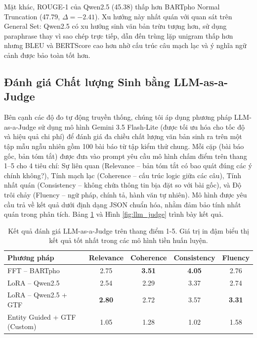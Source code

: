 \documentclass{article}
\begin{document}
Mặt khác, ROUGE-1 của Qwen2.5 (45.38) thấp hơn BARTpho Normal Truncation (47.79, $\Delta = -2.41$). Xu hướng này nhất quán với quan sát trên General Set: Qwen2.5 có xu hướng sinh văn bản trừu tượng hơn, sử dụng paraphrase thay vì sao chép trực tiếp, dẫn đến trùng lặp unigram thấp hơn nhưng BLEU và BERTScore cao hơn nhờ cấu trúc câu mạch lạc và ý nghĩa ngữ cảnh được bảo toàn tốt hơn.

\subsection{Đánh giá Chất lượng Sinh bằng LLM-as-a-Judge}\label{sec:llm_judge}

Bên cạnh các độ đo tự động truyền thống, chúng tôi áp dụng phương pháp LLM-as-a-Judge sử dụng mô hình Gemini 3.5 Flash-Lite (được tối ưu hóa cho tốc độ và hiệu quả chi phí) để đánh giá đa chiều chất lượng văn bản sinh ra trên một tập mẫu ngẫu nhiên gồm 100 bài báo từ tập kiểm thử chung. Mỗi cặp (bài báo gốc, bản tóm tắt) được đưa vào prompt yêu cầu mô hình chấm điểm trên thang 1--5 cho 4 tiêu chí: Sự liên quan (Relevance -- bản tóm tắt có bao quát đúng các ý chính không?), Tính mạch lạc (Coherence -- cấu trúc logic giữa các câu), Tính nhất quán (Consistency -- không chứa thông tin bịa đặt so với bài gốc), và Độ trôi chảy (Fluency -- ngữ pháp, chính tả, hành văn tự nhiên). Mô hình được yêu cầu trả về kết quả dưới định dạng JSON chuẩn hóa, nhằm đảm bảo tính nhất quán trong phân tích. Bảng \ref{tab:llm_judge} và Hình \ref{fig:llm_judge} trình bày kết quả.

\begin{table}[H]
\centering
\caption{Kết quả đánh giá LLM-as-a-Judge trên thang điểm 1-5. Giá trị in đậm biểu thị kết quả tốt nhất trong các mô hình tiền huấn luyện.}
\label{tab:llm_judge}
\begin{tabular}{@{}lcccc@{}}
\toprule
\textbf{Phương pháp} & \textbf{Relevance} & \textbf{Coherence} & \textbf{Consistency} & \textbf{Fluency} \\
\midrule
FFT -- BARTpho & 2.75 & \textbf{3.51} & \textbf{4.05} & 2.76 \\
LoRA -- Qwen2.5 & 2.54 & 2.29 & 3.37 & 2.74 \\
LoRA -- Qwen2.5 + GTF & \textbf{2.80} & 2.72 & 3.57 & \textbf{3.31} \\
\midrule
Entity Guided + GTF (Custom) & 1.05 & 1.28 & 1.02 & 1.58 \\
\bottomrule
\end{tabular}
\end{table}
\end{document}
